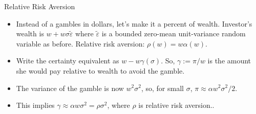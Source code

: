 \documentclass[10pt]{beamer}
\newcommand{\bi}{\begin{itemize}}
\newcommand{\ei}{\end{itemize}}
\newcommand{\im}{\item}
\newcommand{\tve}{\tilde{\varepsilon}}
\begin{document}
\begin{frame}{Relative Risk Aversion}
\bi
\im Instead of a gambles in dollars, let's make it a percent of wealth.  Investor's wealth is $w + w\sigma\tve$ where $\tve$ is a bounded zero-mean unit-variance random variable as before.  Relative risk aversion: $\rho(w) = w\alpha(w)$.
\im Write the certainty equivalent as $w-w\gamma(\sigma)$.  So, $\gamma := \pi/w$ is the amount she would pay \alert{relative to wealth} to avoid the gamble.
\im The variance of the gamble is now $w^2\sigma^2$, so, for small $\sigma$, $\pi \approx \alpha w^2\sigma^2/2$.
\im This implies $\gamma \approx \alpha w \sigma^2 = \rho \sigma^2$, where $\rho$ is \alert{relative risk aversion}..

\ei
\end{frame}
\end{document}
